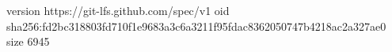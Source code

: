 version https://git-lfs.github.com/spec/v1
oid sha256:fd2bc318803fd710f1e9683a3c6a3211f95fdac8362050747b4218ac2a327ae0
size 6945
